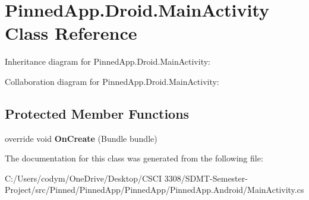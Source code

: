 \hypertarget{class_pinned_app_1_1_droid_1_1_main_activity}{}\section{Pinned\+App.\+Droid.\+Main\+Activity Class Reference}
\label{class_pinned_app_1_1_droid_1_1_main_activity}


Inheritance diagram for Pinned\+App.\+Droid.\+Main\+Activity\+:


Collaboration diagram for Pinned\+App.\+Droid.\+Main\+Activity\+:
\subsection*{Protected Member Functions}
\begin{DoxyCompactItemize}
\item 
\mbox{\label{class_pinned_app_1_1_droid_1_1_main_activity_aa635acf0d67f4c5897c1442dfe253ef9}} 
override void {\bfseries On\+Create} (Bundle bundle)
\end{DoxyCompactItemize}


The documentation for this class was generated from the following file\+:\begin{DoxyCompactItemize}
\item 
C\+:/\+Users/codym/\+One\+Drive/\+Desktop/\+C\+S\+C\+I 3308/\+S\+D\+M\+T-\/\+Semester-\/\+Project/src/\+Pinned/\+Pinned\+App/\+Pinned\+App/\+Pinned\+App.\+Android/Main\+Activity.\+cs\end{DoxyCompactItemize}
